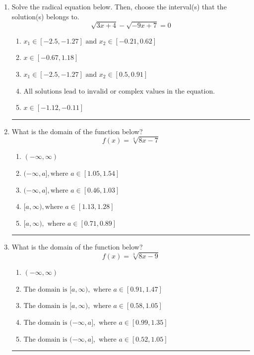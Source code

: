 \documentclass[14pt]{extbook}
\newcommand{\litem}[1]{\item#1\hspace*{-1cm}\rule{\textwidth}{0.4pt}}
\begin{document}
\begin{enumerate}
{\begin{enumerate}[label=\Alph*.]
\end{enumerate} }
\litem{
Solve the radical equation below. Then, choose the interval(s) that the solution(s) belongs to.\[ \sqrt{3 x + 4} - \sqrt{-9 x + 7} = 0 \]\begin{enumerate}[label=\Alph*.]
\item \( x_1 \in [-2.5, -1.27] \text{ and } x_2 \in [-0.21,0.62] \)
\item \( x \in [-0.67,1.18] \)
\item \( x_1 \in [-2.5, -1.27] \text{ and } x_2 \in [0.5,0.91] \)
\item \( \text{All solutions lead to invalid or complex values in the equation.} \)
\item \( x \in [-1.12,-0.11] \)

\end{enumerate} }
\litem{
What is the domain of the function below?\[ f(x) = \sqrt[4]{8 x - 7} \]\begin{enumerate}[label=\Alph*.]
\item \( (-\infty, \infty) \)
\item \( (-\infty, a], \text{where } a \in [1.05, 1.54] \)
\item \( (-\infty, a], \text{where } a \in [0.46, 1.03] \)
\item \( [a, \infty), \text{where } a \in [1.13, 1.28] \)
\item \( [a, \infty), \text{ where } a \in [0.71, 0.89] \)

\end{enumerate} }
\litem{
What is the domain of the function below?\[ f(x) = \sqrt[3]{8 x - 9} \]\begin{enumerate}[label=\Alph*.]
\item \( (-\infty, \infty) \)
\item \( \text{The domain is } [a, \infty), \text{   where } a \in [0.91, 1.47] \)
\item \( \text{The domain is } [a, \infty), \text{   where } a \in [0.58, 1.05] \)
\item \( \text{The domain is } (-\infty, a], \text{   where } a \in [0.99, 1.35] \)
\item \( \text{The domain is } (-\infty, a], \text{   where } a \in [0.52, 1.05] \)

\end{enumerate} }
\end{enumerate}
\end{document}
